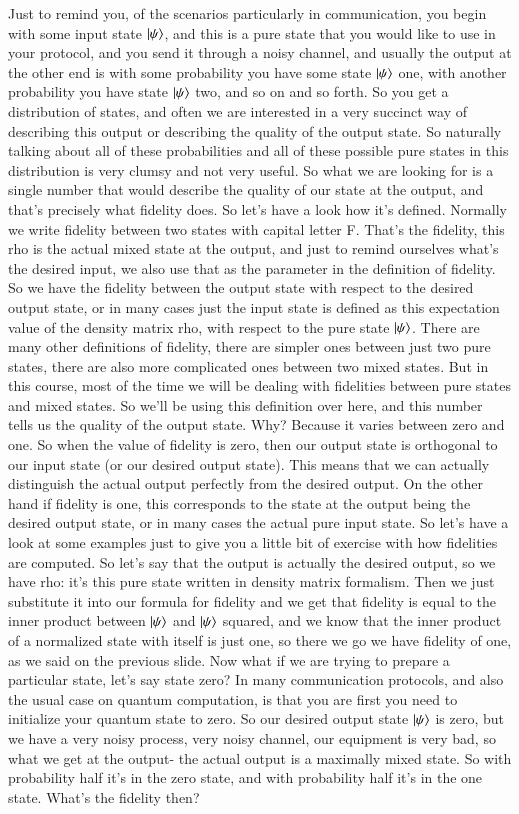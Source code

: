 Just to remind you, of the scenarios particularly in communication, you begin with some input state $\ket{\psi}$, and this is a pure state that you would like to use in your protocol, and you send it through a noisy channel, and usually the output at the other end is with some probability you have some state $\ket{\psi}$ one, with another probability you have state $\ket{\psi}$ two, and so on and so forth. So you get a distribution of states, and often we are interested in a very succinct way of describing this output or describing the quality of the output state. So naturally talking about all of these probabilities and all of these possible pure states in this distribution is very clumsy and not very useful. So what we are looking for is a single number that would describe the quality of our state at the output, and that's precisely what fidelity does. So let's have a look how it's defined. Normally we write fidelity between two states with capital letter F. That's the fidelity, this rho is the actual mixed state at the output, and just to remind ourselves what's the desired input, we also use that as the parameter in the definition of fidelity. So we have the fidelity between the output state with respect to the desired output state, or in many cases just the input state is defined as this expectation value of the density matrix rho, with respect to the pure state $\ket{\psi}$. There are many other definitions of fidelity, there are simpler ones between just two pure states, there are also more complicated ones between two mixed states. But in this course, most of the time we will be dealing with fidelities between pure states and mixed states. So we'll be using this definition over here, and this number tells us the quality of the output state. Why? Because it varies between zero and one. So when the value of fidelity is zero, then our output state is orthogonal to our input state (or our desired output state). This means that we can actually distinguish the actual output perfectly from the desired output. On the other hand if fidelity is one, this corresponds to the state at the output being the desired output state, or in many cases the actual pure input state. So let's have a look at some examples just to give you a little bit of exercise with how fidelities are computed. So let's say that the output is actually the desired output, so we have rho: it's this pure state written in density matrix formalism. Then we just substitute it into our formula for fidelity and we get that fidelity is equal to the inner product between $\ket{\psi}$ and $\ket{\psi}$ squared, and we know that the inner product of a normalized state with itself is just one, so there we go we have fidelity of one, as we said on the previous slide. Now what if we are trying to prepare a particular state, let's say state zero? In many communication protocols, and also the usual case on quantum computation, is that you are first you need to initialize your quantum state to zero. So our desired output state $\ket{\psi}$ is zero, but we have a very noisy process, very noisy channel, our equipment is very bad, so what we get at the output- the actual output is a maximally mixed state. So with probability half it's in the zero state, and with probability half it's in the one state. What's the fidelity then? 